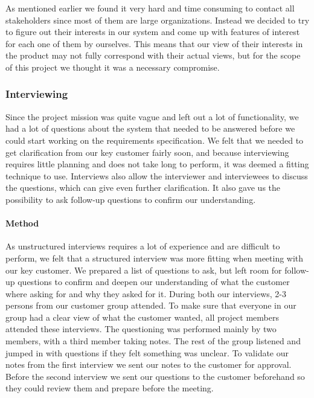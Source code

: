 \documentclass[10pt]{article}
\begin{document}
\noindent As mentioned earlier we found it very hard and time consuming to contact all stakeholders since most of them are large organizations. Instead we decided to try to figure out their interests in our system and come up with features of interest for each one of them by ourselves. This means that our view of their interests in the product may not fully correspond with their actual views, but for the scope of this project we thought it was a necessary compromise.

\subsubsection{Interviewing}
Since the project mission was quite vague and left out a lot of functionality, we had a lot of questions about the system that needed to be answered before we could start working on the requirements specification. We felt that we needed to get clarification from our key customer fairly soon, and because interviewing requires little planning and does not take long to perform, it was deemed a fitting technique to use. Interviews also allow the interviewer and interviewees to discuss the questions, which can give even further clarification. It also gave us the possibility to ask follow-up questions to confirm our understanding.

\paragraph{Method}
\hfill \break
As unstructured interviews requires a lot of experience and are difficult to perform, we felt that a structured interview was more fitting when meeting with our key customer. We prepared a list of questions to ask, but left room for follow-up questions to confirm and deepen our understanding of what the customer where asking for and why they asked for it. During both our interviews, 2-3 persons from our customer group attended. To make sure that everyone in our group had a clear view of what the customer wanted, all project members attended these interviews. The questioning was performed mainly by two members, with a third member taking notes. The rest of the group listened and jumped in with questions if they felt something was unclear. To validate our notes from the first interview we sent our notes to the customer for approval. Before the second interview we sent our questions to the customer beforehand so they could review them and prepare before the meeting.
\end{document}
